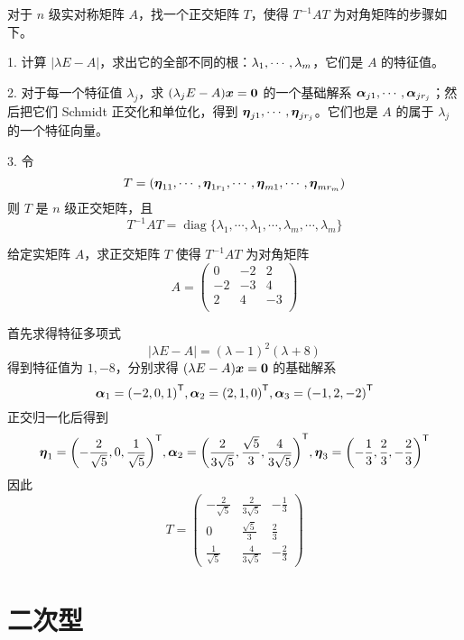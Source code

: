 对于 $n$ 级实对称矩阵 $A$，找一个正交矩阵 $T$，使得 $T^{-1}AT$ 为对角矩阵的步骤如下。

1. 计算 $|\lambda E- A|$，求出它的全部不同的根：$\lambda_1,\cdots,\lambda_m$，它们是 $A$ 的特征值。

2. 对于每一个特征值 $\lambda_j$，求 $(\lambda_jE-A)\boldsymbol{x} = \boldsymbol{0}$ 的一个基础解系 $\boldsymbol{\alpha}_{j1},\cdots,\boldsymbol{\alpha}_{jr_j}$；然后把它们 Schmidt 正交化和单位化，得到 $\boldsymbol{\eta}_{j1},\cdots,\boldsymbol{\eta}_{jr_j}$。它们也是 $A$ 的属于 $\lambda_j$ 的一个特征向量。

3. 令
\[ T=(\boldsymbol{\eta}_{11},\cdots,\boldsymbol{\eta}_{1r_1},\cdots,\boldsymbol{\eta}_{m1},\cdots,\boldsymbol{\eta}_{mr_m}) \]
则 $T$ 是 $n$ 级正交矩阵，且
\[ T^{-1}AT = \operatorname{diag}\{\lambda_{1},\cdots,\lambda_{1},\cdots,\lambda_{m},\cdots,\lambda_{m}\} \]

\begin{example}
	给定实矩阵 $A$，求正交矩阵 $T$ 使得 $T^{-1}AT$ 为对角矩阵
	\[ A=\left(
		\begin{matrix}
				0  & -2 & 2  \\
				-2 & -3 & 4  \\
				2  & 4  & -3 \\
			\end{matrix}
		\right) \]
\end{example}

\begin{solution}
	首先求得特征多项式
	\[ |\lambda E - A| = (\lambda-1)^2(\lambda+8) \]
	得到特征值为 $1, -8$，分别求得 $(\lambda E - A) \boldsymbol{x} = \boldsymbol{0}$ 的基础解系
	\[ \boldsymbol{\alpha}_1 = {(-2, 0, 1)}^\mathsf{T}, \boldsymbol{\alpha}_2 = {(2, 1, 0)}^\mathsf{T}, \boldsymbol{\alpha}_3 = {(-1, 2, -2)}^\mathsf{T} \]
	正交归一化后得到
	\[ \boldsymbol{\eta}_1 = {\left(-\frac{2}{\sqrt{5}}, 0, \frac{1}{\sqrt{5}}\right)}^\mathsf{T}, \boldsymbol{\alpha}_2 = {\left(\frac{2}{3\sqrt{5}}, \frac{\sqrt{5}}{3}, \frac{4}{3 \sqrt{5}}\right)}^\mathsf{T}, \boldsymbol{\eta}_3 = {\left(-\frac{1}{3}, \frac{2}{3}, -\frac{2}{3}\right)}^\mathsf{T} \]
	因此
	\[ T = \left(\begin{matrix}
				-\frac{2}{\sqrt{5}} & \frac{2}{3\sqrt{5}}  & -\frac{1}{3} \\
				0                   & \frac{\sqrt{5}}{3}   & \frac{2}{3}  \\
				\frac{1}{\sqrt{5}}  & \frac{4}{3 \sqrt{5}} & -\frac{2}{3}
			\end{matrix}\right) \]
\end{solution}

\section{二次型}

